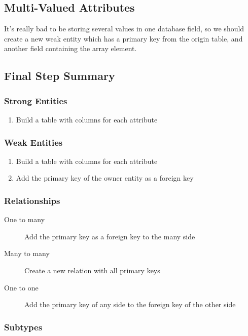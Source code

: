 \subsection{Multi-Valued Attributes}\label{sub:multi_valued_attributes}

It's really bad to be storing several values in one database field, so we should create a new weak entity which has a primary key from the origin table, and another field containing the array element.

\subsection{Final Step Summary}\label{sub:final_step_summary}

\subsubsection{Strong Entities}\label{ssub:strong_entities}


\begin{enumerate}
    \item Build a table with columns for each attribute
\end{enumerate}
\subsubsection{Weak Entities}\label{ssub:weak_entities}


\begin{enumerate}
    \item Build a table with columns for each attribute
    \item Add the primary key of the owner entity as a foreign key
\end{enumerate}
\subsubsection{Relationships}\label{ssub:relationships}


\begin{description}
    \item[One to many] Add the primary key as a foreign key to the many side
    \item[Many to many] Create a new relation with all primary keys
    \item[One to one] Add the primary key of any side to the foreign key of the other side
\end{description}
\subsubsection{Subtypes}\label{ssub:subtypes}


